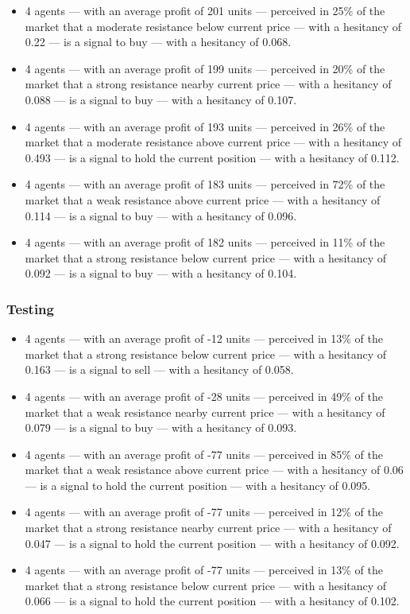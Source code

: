 {\small
  \begin{itemize}
  \item 4 agents — with an average profit of 201 units — perceived in 25\% of
    the market that a moderate resistance below current price — with a hesitancy
    of 0.22 — is a signal to buy — with a hesitancy of 0.068.
  \item 4 agents — with an average profit of 199 units — perceived in 20\% of
    the market that a strong resistance nearby current price — with a hesitancy
    of 0.088 — is a signal to buy — with a hesitancy of 0.107.
  \item 4 agents — with an average profit of 193 units — perceived in 26\% of
    the market that a moderate resistance above current price — with a hesitancy
    of 0.493 — is a signal to hold the current position — with a hesitancy of
    0.112.
  \item 4 agents — with an average profit of 183 units — perceived in 72\% of
    the market that a weak resistance above current price — with a hesitancy of
    0.114 — is a signal to buy — with a hesitancy of 0.096.
  \item 4 agents — with an average profit of 182 units — perceived in 11\% of
    the market that a strong resistance below current price — with a hesitancy
    of 0.092 — is a signal to buy — with a hesitancy of 0.104.
  \end{itemize}
}

\subsubsection{Testing}
\label{}

{\small
  \begin{itemize}
  \item 4 agents — with an average profit of -12 units — perceived in 13\% of
    the market that a strong resistance below current price — with a hesitancy
    of 0.163 — is a signal to sell — with a hesitancy of 0.058.
  \item 4 agents — with an average profit of -28 units — perceived in 49\% of
    the market that a weak resistance nearby current price — with a hesitancy of
    0.079 — is a signal to buy — with a hesitancy of 0.093.
  \item 4 agents — with an average profit of -77 units — perceived in 85\% of
    the market that a weak resistance above current price — with a hesitancy of
    0.06 — is a signal to hold the current position — with a hesitancy of 0.095.
  \item 4 agents — with an average profit of -77 units — perceived in 12\% of
    the market that a strong resistance nearby current price — with a hesitancy
    of 0.047 — is a signal to hold the current position — with a hesitancy of
    0.092.
  \item 4 agents — with an average profit of -77 units — perceived in 13\% of
    the market that a strong resistance below current price — with a hesitancy
    of 0.066 — is a signal to hold the current position — with a hesitancy of
    0.102.
  \end{itemize}
}



